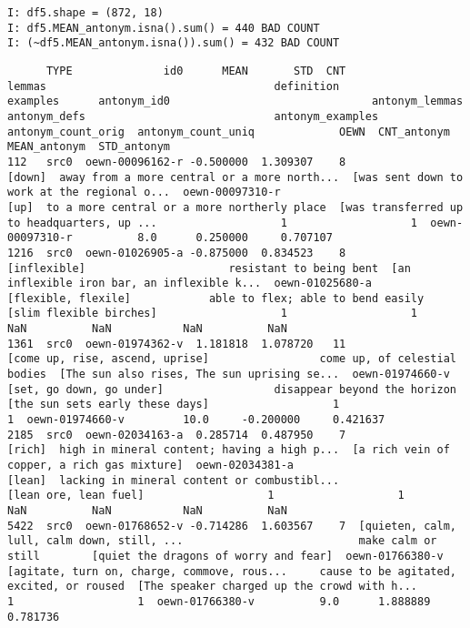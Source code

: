 \documentclass[a4paper,10pt,onecolumn,oneside,openright]{article}
\begin{document}
\begin{verbatim}
I: df5.shape = (872, 18)
I: df5.MEAN_antonym.isna().sum() = 440 BAD COUNT
I: (~df5.MEAN_antonym.isna()).sum() = 432 BAD COUNT
\end{verbatim}
\begin{verbatim}
      TYPE              id0      MEAN       STD  CNT                                       lemmas                                   definition                                     examples      antonym_id0                               antonym_lemmas                                 antonym_defs                             antonym_examples  antonym_count_orig  antonym_count_uniq             OEWN  CNT_antonym  MEAN_antonym  STD_antonym
112   src0  oewn-00096162-r -0.500000  1.309307    8                                       [down]  away from a more central or a more north...  [was sent down to work at the regional o...  oewn-00097310-r                                         [up]  to a more central or a more northerly place  [was transferred up to headquarters, up ...                   1                   1  oewn-00097310-r          8.0      0.250000     0.707107
1216  src0  oewn-01026905-a -0.875000  0.834523    8                                 [inflexible]                      resistant to being bent  [an inflexible iron bar, an inflexible k...  oewn-01025680-a                          [flexible, flexile]            able to flex; able to bend easily                      [slim flexible birches]                   1                   1              NaN          NaN           NaN          NaN
1361  src0  oewn-01974362-v  1.181818  1.078720   11              [come up, rise, ascend, uprise]                 come up, of celestial bodies  [The sun also rises, The sun uprising se...  oewn-01974660-v                     [set, go down, go under]                 disappear beyond the horizon              [the sun sets early these days]                   1                   1  oewn-01974660-v         10.0     -0.200000     0.421637
2185  src0  oewn-02034163-a  0.285714  0.487950    7                                       [rich]  high in mineral content; having a high p...  [a rich vein of copper, a rich gas mixture]  oewn-02034381-a                                       [lean]  lacking in mineral content or combustibl...                        [lean ore, lean fuel]                   1                   1              NaN          NaN           NaN          NaN
5422  src0  oewn-01768652-v -0.714286  1.603567    7  [quieten, calm, lull, calm down, still, ...                           make calm or still        [quiet the dragons of worry and fear]  oewn-01766380-v  [agitate, turn on, charge, commove, rous...     cause to be agitated, excited, or roused  [The speaker charged up the crowd with h...                   1                   1  oewn-01766380-v          9.0      1.888889     0.781736

\end{verbatim}
\end{document}

